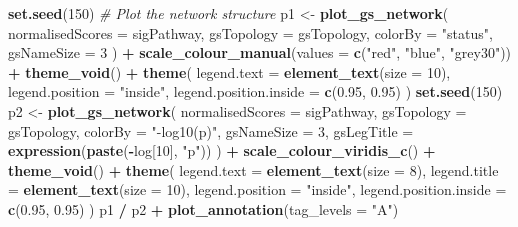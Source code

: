 \documentclass[9pt,a4paper,]{extarticle}
\newenvironment{Shaded}{\begin{snugshade}}{\end{snugshade}}
\newcommand{\AttributeTok}[1]{\textcolor[rgb]{0.13,0.29,0.53}{#1}}
\newcommand{\CommentTok}[1]{\textcolor[rgb]{0.56,0.35,0.01}{\textit{#1}}}
\newcommand{\DecValTok}[1]{\textcolor[rgb]{0.00,0.00,0.81}{#1}}
\newcommand{\FloatTok}[1]{\textcolor[rgb]{0.00,0.00,0.81}{#1}}
\newcommand{\FunctionTok}[1]{\textcolor[rgb]{0.13,0.29,0.53}{\textbf{#1}}}
\newcommand{\NormalTok}[1]{#1}
\newcommand{\OtherTok}[1]{\textcolor[rgb]{0.56,0.35,0.01}{#1}}
\newcommand{\SpecialCharTok}[1]{\textcolor[rgb]{0.81,0.36,0.00}{\textbf{#1}}}
\newcommand{\StringTok}[1]{\textcolor[rgb]{0.31,0.60,0.02}{#1}}
\begin{document}
\begin{Shaded}
\begin{Highlighting}[]
\FunctionTok{set.seed}\NormalTok{(}\DecValTok{150}\NormalTok{)}
\CommentTok{\# Plot the network structure}
\NormalTok{p1 }\OtherTok{\textless{}{-}} \FunctionTok{plot\_gs\_network}\NormalTok{(}
  \AttributeTok{normalisedScores =}\NormalTok{ sigPathway, }\AttributeTok{gsTopology =}\NormalTok{ gsTopology, }\AttributeTok{colorBy =} \StringTok{"status"}\NormalTok{,}
  \AttributeTok{gsNameSize =} \DecValTok{3}
\NormalTok{) }\SpecialCharTok{+}
  \FunctionTok{scale\_colour\_manual}\NormalTok{(}\AttributeTok{values =} \FunctionTok{c}\NormalTok{(}\StringTok{"red"}\NormalTok{, }\StringTok{"blue"}\NormalTok{, }\StringTok{"grey30"}\NormalTok{)) }\SpecialCharTok{+}
  \FunctionTok{theme\_void}\NormalTok{() }\SpecialCharTok{+}
  \FunctionTok{theme}\NormalTok{(}
    \AttributeTok{legend.text =} \FunctionTok{element\_text}\NormalTok{(}\AttributeTok{size =} \DecValTok{10}\NormalTok{),}
    \AttributeTok{legend.position =} \StringTok{"inside"}\NormalTok{,}
    \AttributeTok{legend.position.inside =} \FunctionTok{c}\NormalTok{(}\FloatTok{0.95}\NormalTok{, }\FloatTok{0.95}\NormalTok{)}
\NormalTok{  ) }
\FunctionTok{set.seed}\NormalTok{(}\DecValTok{150}\NormalTok{)}
\NormalTok{p2 }\OtherTok{\textless{}{-}} \FunctionTok{plot\_gs\_network}\NormalTok{(}
  \AttributeTok{normalisedScores =}\NormalTok{ sigPathway,}
  \AttributeTok{gsTopology =}\NormalTok{ gsTopology, }
  \AttributeTok{colorBy  =} \StringTok{"{-}log10(p)"}\NormalTok{, }
  \AttributeTok{gsNameSize =} \DecValTok{3}\NormalTok{,}
  \AttributeTok{gsLegTitle =} \FunctionTok{expression}\NormalTok{(}\FunctionTok{paste}\NormalTok{(}\SpecialCharTok{{-}}\NormalTok{log[}\DecValTok{10}\NormalTok{], }\StringTok{"p"}\NormalTok{))}
\NormalTok{) }\SpecialCharTok{+}
  \FunctionTok{scale\_colour\_viridis\_c}\NormalTok{() }\SpecialCharTok{+}
  \FunctionTok{theme\_void}\NormalTok{() }\SpecialCharTok{+}
  \FunctionTok{theme}\NormalTok{(}
    \AttributeTok{legend.text =} \FunctionTok{element\_text}\NormalTok{(}\AttributeTok{size =} \DecValTok{8}\NormalTok{),}
    \AttributeTok{legend.title =} \FunctionTok{element\_text}\NormalTok{(}\AttributeTok{size =} \DecValTok{10}\NormalTok{),}
    \AttributeTok{legend.position =} \StringTok{"inside"}\NormalTok{,}
    \AttributeTok{legend.position.inside =} \FunctionTok{c}\NormalTok{(}\FloatTok{0.95}\NormalTok{, }\FloatTok{0.95}\NormalTok{)}
\NormalTok{  ) }
\NormalTok{p1 }\SpecialCharTok{/}\NormalTok{ p2 }\SpecialCharTok{+} \FunctionTok{plot\_annotation}\NormalTok{(}\AttributeTok{tag\_levels =} \StringTok{"A"}\NormalTok{) }
\end{Highlighting}
\end{Shaded}
\end{document}
